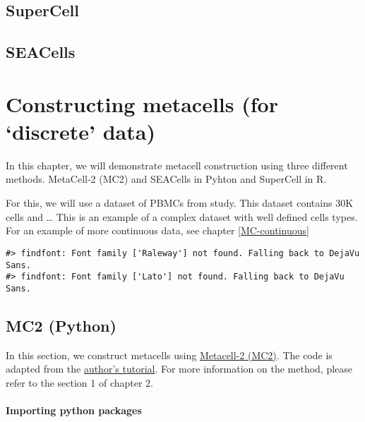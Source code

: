 \documentclass[
]{book}
\begin{document}
\hypertarget{SuperCell}{%
\section{SuperCell}\label{SuperCell}}

\hypertarget{SEACells}{%
\section{SEACells}\label{SEACells}}

\hypertarget{constructing-metacells-for-discrete-data}{%
\chapter{Constructing metacells (for `discrete' data)}\label{constructing-metacells-for-discrete-data}}

In this chapter, we will demonstrate metacell construction using three different methods. MetaCell-2 (MC2) and SEACells in Pyhton and SuperCell in R.

For this, we will use a dataset of PBMCs from study. This dataset contains 30K cells and \ldots{} This is an example of a complex dataset with well defined cells types. For an example of more continuous data, see chapter \ref{MC-continuous}

\begin{verbatim}
#> findfont: Font family ['Raleway'] not found. Falling back to DejaVu Sans.
#> findfont: Font family ['Lato'] not found. Falling back to DejaVu Sans.
\end{verbatim}

\hypertarget{mc2-python}{%
\section{MC2 (Python)}\label{mc2-python}}

In this section, we construct metacells using \href{https://github.com/tanaylab/metacells}{Metacell-2 (MC2)}. The code is adapted from the \href{https://metacells.readthedocs.io/en/latest/Metacells_Vignette.html}{author's tutorial}. For more information on the method, please refer to the section 1 of chapter 2.

\hypertarget{importing-python-packages}{%
\subsubsection*{Importing python packages}\label{importing-python-packages}}
\end{document}
